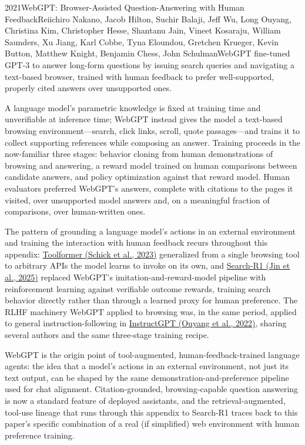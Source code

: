 
\begin{papersummary}{2021}{WebGPT: Browser-Assisted Question-Answering with Human Feedback}{Reiichiro Nakano, Jacob Hilton, Suchir Balaji, Jeff Wu, Long Ouyang, Christina Kim, Christopher Hesse, Shantanu Jain, Vineet Kosaraju, William Saunders, Xu Jiang, Karl Cobbe, Tyna Eloundou, Gretchen Krueger, Kevin Button, Matthew Knight, Benjamin Chess, John Schulman}{WebGPT fine-tuned GPT-3 to answer long-form questions by issuing search queries and navigating a text-based browser, trained with human feedback to prefer well-supported, properly cited answers over unsupported ones.}

A language model's parametric knowledge is fixed at training time and unverifiable at inference time; WebGPT instead gives the model a text-based browsing environment---search, click links, scroll, quote passages---and trains it to collect supporting references while composing an answer. Training proceeds in the now-familiar three stages: behavior cloning from human demonstrations of browsing and answering, a reward model trained on human comparisons between candidate answers, and policy optimization against that reward model. Human evaluators preferred WebGPT's answers, complete with citations to the pages it visited, over unsupported model answers and, on a meaningful fraction of comparisons, over human-written ones.

The pattern of grounding a language model's actions in an external environment and training the interaction with human feedback recurs throughout this appendix: \hyperref[paper:schick-2023]{Toolformer (Schick et al., 2023)} generalized from a single browsing tool to arbitrary APIs the model learns to invoke on its own, and \hyperref[paper:jin-2025-search-r1]{Search-R1 (Jin et al., 2025)} replaced WebGPT's imitation-and-reward-model pipeline with reinforcement learning against verifiable outcome rewards, training search behavior directly rather than through a learned proxy for human preference. The RLHF machinery WebGPT applied to browsing was, in the same period, applied to general instruction-following in \hyperref[paper:ouyang-2022]{InstructGPT (Ouyang et al., 2022)}, sharing several authors and the same three-stage training recipe.

WebGPT is the origin point of tool-augmented, human-feedback-trained language agents: the idea that a model's actions in an external environment, not just its text output, can be shaped by the same demonstration-and-preference pipeline used for chat alignment. Citation-grounded, browsing-capable question answering is now a standard feature of deployed assistants, and the retrieval-augmented, tool-use lineage that runs through this appendix to Search-R1 traces back to this paper's specific combination of a real (if simplified) web environment with human preference training.

\end{papersummary}
